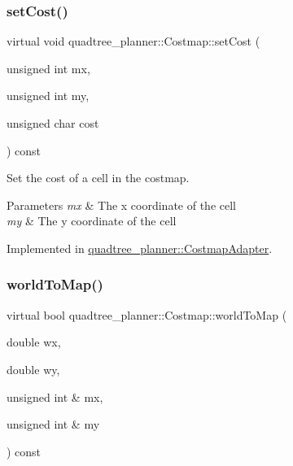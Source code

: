 \mbox{\label{classquadtree__planner_1_1Costmap_a5384641291709625c2215144e97cf69c}} 
\subsubsection{\texorpdfstring{set\+Cost()}{setCost()}}
{\footnotesize\ttfamily virtual void quadtree\+\_\+planner\+::\+Costmap\+::set\+Cost (\begin{DoxyParamCaption}\item[{unsigned int}]{mx,  }\item[{unsigned int}]{my,  }\item[{unsigned char}]{cost }\end{DoxyParamCaption}) const\hspace{0.3cm}{\ttfamily [pure virtual]}}



Set the cost of a cell in the costmap. 


\begin{DoxyParams}{Parameters}
{\em mx} & The x coordinate of the cell \\
\hline
{\em my} & The y coordinate of the cell \\
\hline
\end{DoxyParams}


Implemented in \hyperlink{classquadtree__planner_1_1CostmapAdapter_a816f4036c5a67297c72302ad4329b98b}{quadtree\+\_\+planner\+::\+Costmap\+Adapter}.

\mbox{\label{classquadtree__planner_1_1Costmap_aba601c58933da74c707214d4dba2925a}} 
\subsubsection{\texorpdfstring{world\+To\+Map()}{worldToMap()}}
{\footnotesize\ttfamily virtual bool quadtree\+\_\+planner\+::\+Costmap\+::world\+To\+Map (\begin{DoxyParamCaption}\item[{double}]{wx,  }\item[{double}]{wy,  }\item[{unsigned int \&}]{mx,  }\item[{unsigned int \&}]{my }\end{DoxyParamCaption}) const\hspace{0.3cm}{\ttfamily [pure virtual]}}



